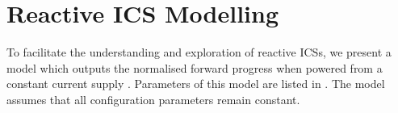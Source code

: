 
\section{Reactive ICS Modelling} \label{sec:c3_model}



To facilitate the understanding and exploration of reactive ICSs, we present a model which outputs the normalised forward progress  when powered from a constant current supply . Parameters of this model are listed in . 
The model assumes that all configuration parameters remain constant. 

